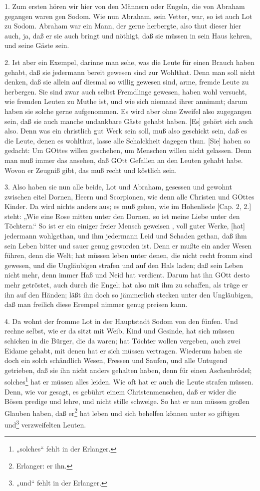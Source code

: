 1. Zum ersten hören wir hier von den Männern oder Engeln, die von Abraham gegangen waren gen Sodom. Wie nun Abraham, sein Vetter, war, so ist auch Lot zu Sodom. Abraham war ein Mann, der gerne herbergte, also thut dieser hier auch, ja, daß er sie auch bringt und nöthigt, daß sie müssen in sein Haus kehren, und seine Gäste sein.

2. Ist aber ein Exempel, darinne man sehe, was die Leute für einen Brauch haben gehabt, daß sie jedermann bereit gewesen sind zur Wohlthat. Denn man soll nicht denken, daß sie allein auf diesmal so willig gewesen sind, arme, fremde Leute zu herbergen. Sie sind zwar auch selbst Fremdlinge gewesen, haben wohl versucht, wie fremden Leuten zu Muthe ist, und wie sich niemand ihrer annimmt; darum haben sie solche gerne aufgenommen. Es wird aber ohne Zweifel also zugegangen sein, daß sie auch manche undankbare Gäste gehabt haben. [Es] gehört sich auch also. Denn was ein christlich gut Werk sein soll, muß also geschickt sein, daß es die Leute, denen es wohlthut, lasse alle Schalckheit dagegen thun. [Sie] haben so gedacht: Um GOttes willen geschehen, um Menschen willen nicht gelassen. Denn man muß immer das ansehen, daß GOtt Gefallen an den Leuten gehabt habe. Wovon er Zeugniß gibt, das muß recht und köstlich sein.

3. Also haben sie nun alle beide, Lot und Abraham, gesessen und gewohnt zwischen eitel Dornen, Heern und Scorpionen, wie denn alle Christen und GOttes Kinder. Da wird nichts anders aus; es muß gehen, wie im Hohenliede [Cap. 2, 2.] steht: „Wie eine Rose mitten unter den Dornen, so ist meine Liebe unter den Töchtern.“ So ist er ein einiger freier Mensch geweisen
, voll guter Werke, [hat] jedermann wohlgethan, und ihm jedermann Leid und Schaden gethan, daß ihm sein Leben bitter und sauer genug geworden ist. Denn er mußte ein ander Wesen führen, denn die Welt; hat müssen leben unter denen, die nicht recht fromm sind gewesen, und die Ungläubigen strafen und auf den Hals laden; daß sein Leben nicht mehr, denn immer Haß und Neid hat verdient. Darum hat ihn GOtt desto mehr getröstet, auch durch die Engel; hat also mit ihm zu schaffen, als trüge er ihn auf den Händen; läßt ihn doch so jämmerlich stecken unter den Ungläubigen, daß man freilich diese Erempel nimmer genug preisen kann.

4. Da wohnt der fromme Lot in der Hauptstadt Sodom von den fünfen. Und rechne selbst, wie er da sitzt mit Weib, Kind und Gesinde, hat sich müssen schicken in die Bürger, die da waren; hat Töchter wollen vergeben, auch zwei Eidame gehabt, mit denen hat er sich müssen vertragen. Wiederum haben sie doch ein solch schändlich Wesen, Fressen und Saufen, und alle Untugend getrieben, daß sie ihn nicht anders gehalten haben, denn für einen Aschenbrödel; solches\footnote{„solches“ fehlt in der Erlanger.} hat er müssen alles leiden. Wie oft hat er auch die Leute strafen müssen. Denn, wie vor gesagt, es gebührt einem Christenmenschen, daß er wider die Bösen predige und lehre, und nicht stille schweige. So hat er nun müssen großen Glauben haben, daß er\footnote{Erlanger: er ihn.} hat leben und sich behelfen können unter so giftigen und\footnote{„und“ fehlt in der Erlanger.} verzweifelten Leuten.

